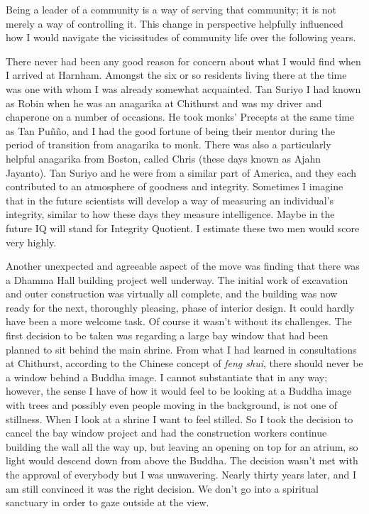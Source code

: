 Being a leader of a community is a way of serving that community; it is
not merely a way of controlling it. This change in perspective helpfully
influenced how I would navigate the vicissitudes of community life over
the following years.

\enlargethispage{\baselineskip}

There never had been any good reason for concern about what I would find
when I arrived at Harnham. Amongst the six or so residents living there
at the time was one with whom I was already somewhat acquainted. Tan
Suriyo I had known as Robin when he was an anagarika at Chithurst and
was my driver and chaperone on a number of occasions. He took monks'
Precepts at the same time as Tan Puñño, and I had the good fortune of
being their mentor during the period of transition from anagarika to
monk. There was also a particularly helpful anagarika from Boston,
called Chris (these days known as Ajahn Jayanto). Tan Suriyo and he were
from a similar part of America, and they each contributed to an
atmosphere of goodness and integrity. Sometimes I imagine that in the
future scientists will develop a way of measuring an individual's
integrity, similar to how these days they measure intelligence. Maybe in
the future IQ will stand for Integrity Quotient. I estimate these two
men would score very highly.

Another unexpected and agreeable aspect of the move was finding that
there was a Dhamma Hall building project well underway. The initial
work of excavation and outer construction was virtually all complete,
and the building was now ready for the next, thoroughly pleasing, phase
of interior design. It could hardly have been a more welcome task. Of
course it wasn't without its challenges. The first decision to be taken
was regarding a large bay window that had been planned to sit behind the
main shrine. From what I had learned in consultations at Chithurst,
according to the Chinese concept of \emph{feng shui}, there should never
be a window behind a Buddha image. I cannot substantiate that in any
way; however, the sense I have of how it would feel to be looking at a
Buddha image with trees and possibly even people moving in the
background, is not one of stillness. When I look at a shrine I want to
feel stilled. So I took the decision to cancel the bay window project
and had the construction workers continue building the wall all the way
up, but leaving an opening on top for an atrium, so light would descend
down from above the Buddha. The decision wasn't met with the approval of
everybody but I was unwavering. Nearly thirty years later, and I am
still convinced it was the right decision. We don't go into a spiritual
sanctuary in order to gaze outside at the view.

